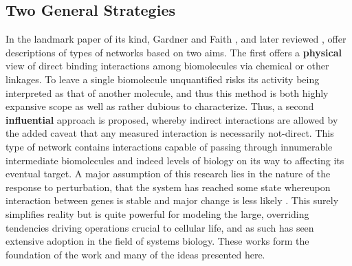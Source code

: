 \subsection{Two General Strategies}
\label{sec:purpose}
In the landmark paper of its kind, Gardner and Faith \citep{gardner2005reverse}, and later reviewed \citep{HECKER200986}, offer descriptions of types of networks based on two aims. The first offers a \textbf{physical} view of direct binding interactions among biomolecules via chemical or other linkages. To leave a single biomolecule unquantified risks its activity being interpreted as that of another molecule, and thus this method is both highly expansive scope as well as rather dubious to characterize. Thus, a second \textbf{influential} approach is proposed, whereby indirect interactions are allowed by the added caveat that any measured interaction is necessarily not-direct. This type of network contains interactions capable of passing through innumerable intermediate biomolecules and indeed levels of biology on its way to affecting its eventual target. A major assumption of this research lies in the nature of the response to perturbation, \ie that the system has reached some state whereupon interaction between genes is stable and major change is less likely \citep{gardner2003inferring, faith2007large,tegner2003reverse}. This surely simplifies reality but is quite powerful for modeling the large, overriding tendencies driving operations crucial to cellular life, and as such has seen extensive adoption in the field of systems biology.  These works form the foundation of the work and many of the ideas presented here. 


